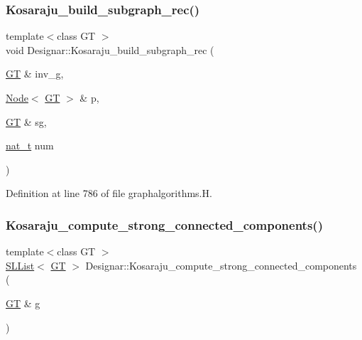 \subsubsection{\texorpdfstring{Kosaraju\+\_\+build\+\_\+subgraph\+\_\+rec()}{Kosaraju\_build\_subgraph\_rec()}}
{\footnotesize\ttfamily template$<$class GT $>$ \\
void Designar\+::\+Kosaraju\+\_\+build\+\_\+subgraph\+\_\+rec (\begin{DoxyParamCaption}\item[{\hyperlink{demo-buildgraph_8_c_a3001c40d2c31ca87ed96cd7d1334a55e}{GT} \&}]{inv\+\_\+g,  }\item[{\hyperlink{namespace_designar_a5af326c65aa2bd26b26c410f2030d09e}{Node}$<$ \hyperlink{demo-buildgraph_8_c_a3001c40d2c31ca87ed96cd7d1334a55e}{GT} $>$ \&}]{p,  }\item[{\hyperlink{demo-buildgraph_8_c_a3001c40d2c31ca87ed96cd7d1334a55e}{GT} \&}]{sg,  }\item[{\hyperlink{namespace_designar_aa72662848b9f4815e7bf31a7cf3e33d1}{nat\+\_\+t}}]{num }\end{DoxyParamCaption})}



Definition at line 786 of file graphalgorithms.\+H.

\mbox{\label{namespace_designar_a53b8f28f7265931cb9a0d2ef95fec0d1}} 
\subsubsection{\texorpdfstring{Kosaraju\+\_\+compute\+\_\+strong\+\_\+connected\+\_\+components()}{Kosaraju\_compute\_strong\_connected\_components()}}
{\footnotesize\ttfamily template$<$class GT $>$ \\
\hyperlink{class_designar_1_1_s_l_list}{S\+L\+List}$<$ \hyperlink{demo-buildgraph_8_c_a3001c40d2c31ca87ed96cd7d1334a55e}{GT} $>$ Designar\+::\+Kosaraju\+\_\+compute\+\_\+strong\+\_\+connected\+\_\+components (\begin{DoxyParamCaption}\item[{\hyperlink{demo-buildgraph_8_c_a3001c40d2c31ca87ed96cd7d1334a55e}{GT} \&}]{g }\end{DoxyParamCaption})}



